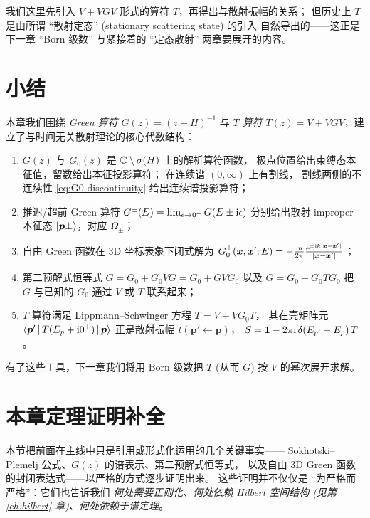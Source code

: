 \begin{remark}[历史与逻辑顺序]
我们这里先引入 $V+VGV$ 形式的算符 $T$，再得出与散射振幅的关系；
但历史上 $T$ 是由所谓 ``散射定态'' (stationary scattering state) 的引入
自然导出的——这正是下一章 ``Born 级数'' 与紧接着的 ``定态散射''
两章要展开的内容。
\end{remark}

\section{小结}

本章我们围绕 \emph{Green 算符} $G(z)=(z-H)^{-1}$ 与
\emph{$T$ 算符} $T(z)=V+VGV$，建立了与时间无关散射理论的核心代数结构：
\begin{enumerate}
  \item $G(z)$ 与 $G_0(z)$ 是 $\mathbb{C}\setminus\sigma(H)$ 上的解析算符函数，
        极点位置给出束缚态本征值，留数给出本征投影算符；
        在连续谱 $(0,\infty)$ 上有割线，
        割线两侧的不连续性 \eqref{eq:G0-discontinuity}
        给出连续谱投影算符；
  \item 推迟/超前 Green 算符 $G^\pm(E)=\lim_{\epsilon\to 0^+}G(E\pm\mathrm{i}\epsilon)$
        分别给出散射 improper 本征态 $\ket{\bm p\pm}$，对应 $\Omega_\pm$；
  \item 自由 Green 函数在 3D 坐标表象下闭式解为
        $G_0^\pm(\bm x,\bm x';E)=-\frac{m}{2\pi}\frac{\mathrm{e}^{\pm\mathrm{i} k|\bm x-\bm x'|}}{|\bm x-\bm x'|}$；
  \item 第二预解式恒等式
        $G=G_0+G_0 V G=G_0+G V G_0$
        以及
        $G=G_0+G_0 T G_0$ 把 $G$ 与已知的 $G_0$ 通过 $V$ 或 $T$ 联系起来；
  \item $T$ 算符满足 Lippmann--Schwinger 方程 $T=V+VG_0 T$，
        其在壳矩阵元
        $\left\langle \bm p' \,\middle|\, T(E_p+\mathrm{i} 0^+) \,\middle|\, \bm p \right\rangle$
        正是散射振幅 $t(\bm p'\leftarrow\bm p)$，
        $S=\mathbf 1-2\pi\mathrm{i}\,\delta(E_{p'}-E_p)\,T$。
\end{enumerate}
有了这些工具，下一章我们将用 Born 级数把 $T$ (从而 $G$) 按 $V$ 的幂次展开求解。

\section{本章定理证明补全}\label{sec:G-proofs}

本节把前面在主线中只是引用或形式化运用的几个关键事实——
Sokhotski--Plemelj 公式、$G(z)$ 的谱表示、第二预解式恒等式，
以及自由 3D Green 函数的封闭表达式——以严格的方式逐步证明出来。
这些证明并不仅仅是 ``为严格而严格''：它们也告诉我们
\emph{何处需要正则化、何处依赖 Hilbert 空间结构 (见第 \ref{ch:hilbert} 章)、何处依赖于谱定理}。

